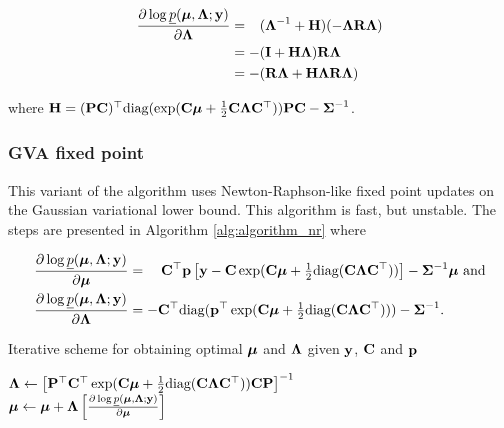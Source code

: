 \documentclass{article}[12pt]
\begin{document}
\begin{align*}
\frac{\partial \log \underline{p}({\boldsymbol \mu}, {\boldsymbol \Lambda}; {\bf y})}{\partial {\boldsymbol\Lambda}}
&= \hphantom{-}({\boldsymbol \Lambda}^{-1} + {\bf H})(-{\boldsymbol \Lambda} {\bf R} {\boldsymbol \Lambda}) \\
&= -({\bf I} + {\bf H}{\boldsymbol \Lambda}){\bf R}{\boldsymbol \Lambda} \\
&= - ({\bf R}{\boldsymbol \Lambda} + {\bf H}{\boldsymbol \Lambda}{\bf R}{\boldsymbol \Lambda})
\end{align*} 

where ${\bf H} = ({\bf P} {\bf C})^\top \text{diag}(\exp({\bf C} {\boldsymbol \mu} + {\tfrac{1}{2}} {\bf C} {\boldsymbol \Lambda} {\bf C}^\top)) {\bf P} {\bf C} - {\boldsymbol \Sigma}^{-1}$.


\subsubsection{GVA fixed point}


This variant of the algorithm uses Newton-Raphson-like fixed point updates on the Gaussian variational lower
bound. This algorithm is fast, but unstable. The steps are presented in Algorithm \ref{alg:algorithm_nr} where

\begin{align*}
\frac{\partial \log \underline{p}({\boldsymbol \mu}, {\boldsymbol \Lambda}; {\bf y})}{\partial {\boldsymbol\mu}} &= \quad {\bf C}^\top{\bf p} \left [{\bf y} - {\bf C}\exp({\bf C} {\boldsymbol \mu} + {\tfrac{1}{2}} \text{diag}({\bf C} {\boldsymbol \Lambda} {\bf C}^\top)) \right ] - {\boldsymbol \Sigma}^{-1} {\boldsymbol \mu} \text{ and}\\
\frac{\partial \log \underline{p}({\boldsymbol \mu}, {\boldsymbol \Lambda}; {\bf y})}{\partial {\boldsymbol\Lambda}} &= -{\bf C}^\top \text{diag}({\bf p}^\top \exp({\bf C} {\boldsymbol \mu} +{\tfrac{1}{2}} \text{diag}({\bf C} {\boldsymbol \Lambda} {\bf C}^\top))) - {\boldsymbol \Sigma}^{-1}.
\end{align*}

\begin{algorithm}
\caption[Algorithm GVA NR]{Iterative scheme for obtaining optimal ${\boldsymbol \mu}$ and ${\boldsymbol \Lambda}$
given ${\bf y}$, ${\bf C}$ and ${\bf p}$}
\label{alg:algorithm_nr}
\begin{algorithmic}
\STATE ${\boldsymbol \Lambda} \leftarrow \left [ {\bf P}^\top {\bf C}^\top \exp({\bf C} {\boldsymbol \mu} + {\tfrac{1}{2}} \text{diag}({\bf C} {\boldsymbol \Lambda} {\bf C}^\top)) {\bf C} {\bf P} \right ]^{-1}$ \\ [1ex]
\STATE ${\boldsymbol \mu} \leftarrow {\boldsymbol\mu} + {\boldsymbol \Lambda} \left [ \frac{\partial \log \underline{p}({\boldsymbol \mu}, {\boldsymbol \Lambda}; {\bf y})}{\partial {\boldsymbol\mu}} \right ]$
\ENDWHILE
\end{algorithmic}
\end{algorithm}
\end{document}
